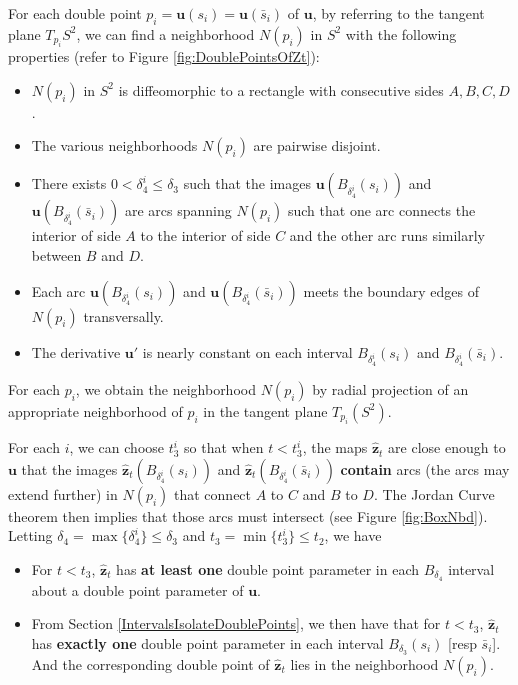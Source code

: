 \documentclass[12pt]{article}
\numberwithin{equation}{subsection}
\theoremstyle{definition}
\numberwithin{lem}{section}
\def\uu{\mathbf{u}}
\def\zhat{\mathbf{\hat{z}}}
\begin{document}
 
For each double point $p_i = \uu(s_i) = \uu(\bar{s}_i)$ of $\uu$, by referring to the tangent plane $T_{p_i}S^2$, we can find a neighborhood $N(p_i)$ in $S^2$ with the following properties (refer to Figure \ref{fig:DoublePointsOfZt}):
\begin{itemize}
\item $N(p_i)$ in $S^2$  is diffeomorphic to a rectangle with consecutive sides $A, B, C, D$.
\item The various neighborhoods $N(p_i)$ are pairwise disjoint.
\item There exists $0< \delta_4^i \leq \delta_3$ such that the images $\uu(B_{\delta_4^i}(s_i))$ and $\uu(B_{\delta_4^i}(\bar{s}_i))$ are arcs spanning $N(p_i)$ such that one arc connects the interior of side $A$ to the interior of side $C$ and the other arc runs similarly between $B$ and $D$.
\item Each arc $\uu(B_{\delta_4^i}(s_i))$ and $\uu(B_{\delta_4^i}(\bar{s}_i))$ meets the boundary edges of $N(p_i)$ transversally.
\item The derivative $\uu'$ is nearly constant on each  interval $B_{\delta_4^i}(s_i)$ and $B_{\delta_4^i}(\bar{s}_i)$.
\end{itemize} 

For each $p_i$, we obtain the neighborhood $N(p_i)$ by radial projection of an appropriate neighborhood of $p_i$ in the tangent plane $T_{p_i}(S^2)$.

For each $i$, we can choose $t_3^i$ so that when $t<t_3^i$, the maps $\zhat_t$ are close enough to $\uu$ that  the images $\zhat_t(B_{\delta_4^i}(s_i))$ and $\zhat_t(B_{\delta_4^i}(\bar{s}_i))$ {\bf contain} arcs (the arcs may extend further) in $N(p_i)$ that connect $A$ to $C$ and $B$ to $D$. The Jordan Curve theorem then implies that those arcs must intersect (see Figure \ref{fig:BoxNbd}).
Letting $\delta_4 = \max \{\delta_4^i \} \leq \delta_3$ and  $t_3 = \min \{t_3^i\} \leq t_2$, we have
\begin{itemize}
\item For $t<t_3$, $\zhat_t$ has {\bf at least one} double point parameter in each  $B_{\delta_4}$ interval about a double point parameter of $\uu$.
\item From Section \ref{IntervalsIsolateDoublePoints}, we then have that for $t<t_3$, $\zhat_t$ has {\bf exactly one} double point parameter in each   interval $B_{\delta_3}(s_i)$ [resp $\bar{s}_i$]. And the corresponding double point of $\zhat_t$ lies in the neighborhood $N(p_i)$.
\end{itemize}
\end{document}

